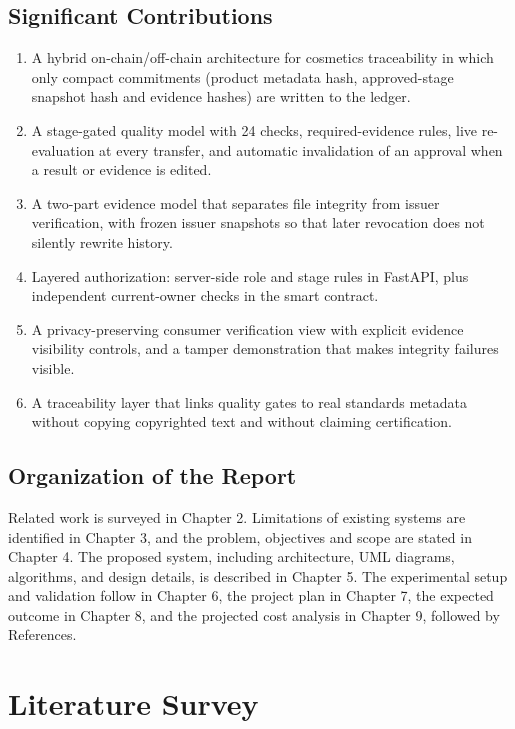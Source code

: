 \documentclass[12pt,a4paper]{report}
\begin{document}
\section{Significant Contributions}
\begin{enumerate}[leftmargin=1.5em]
    \item A hybrid on-chain/off-chain architecture for cosmetics traceability in which only compact commitments (product metadata hash, approved-stage snapshot hash and evidence hashes) are written to the ledger.
    \item A stage-gated quality model with 24 checks, required-evidence rules, live re-evaluation at every transfer, and automatic invalidation of an approval when a result or evidence is edited.
    \item A two-part evidence model that separates file integrity from issuer verification, with frozen issuer snapshots so that later revocation does not silently rewrite history.
    \item Layered authorization: server-side role and stage rules in FastAPI, plus independent current-owner checks in the smart contract.
    \item A privacy-preserving consumer verification view with explicit evidence visibility controls, and a tamper demonstration that makes integrity failures visible.
    \item A traceability layer that links quality gates to real standards metadata without copying copyrighted text and without claiming certification.
\end{enumerate}

\section{Organization of the Report}
Related work is surveyed in Chapter 2. Limitations of existing systems are identified in Chapter 3, and the problem, objectives and scope are stated in Chapter 4. The proposed system, including architecture, UML diagrams, algorithms, and design details, is described in Chapter 5. The experimental setup and validation follow in Chapter 6, the project plan in Chapter 7, the expected outcome in Chapter 8, and the projected cost analysis in Chapter 9, followed by References.

\chapter{Literature Survey}
\end{document}
